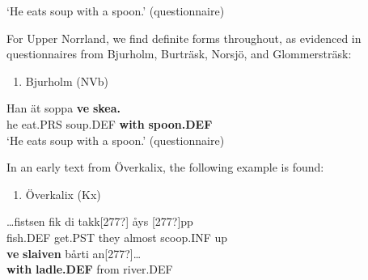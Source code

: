‘He eats soup with a spoon.’ (questionnaire)
\z


For Upper Norrland, we find definite forms throughout, as evidenced in questionnaires from Bjurholm, Burträsk, Norsjö, and Glommersträsk:

\begin{enumerate} %
\item 
Bjurholm (NVb)

\end{enumerate} %
\ea\label{}
\gll Han  ät  soppa  \textbf{ve} \textbf{skea.} \\


he  eat.PRS  soup.DEF  \textbf{with} \textbf{spoon.DEF} \\ %


‘He eats soup with a spoon.’ (questionnaire)
\z


In an early text from Överkalix, the following example is found:

\begin{enumerate} %
\item 
Överkalix (Kx)

\end{enumerate} %
\ea\label{}
\gll …fistsen  fik  di  takk[277?]  åys  [277?]pp\\


fish.DEF  get.PST  they  almost  scoop.INF  up\\ %


\ea\label{}
\gll \textbf{ve} \textbf{slaiven} bårti  an[277?]…\\


\textbf{with} \textbf{ladle.DEF} from  river.DEF\\ %


